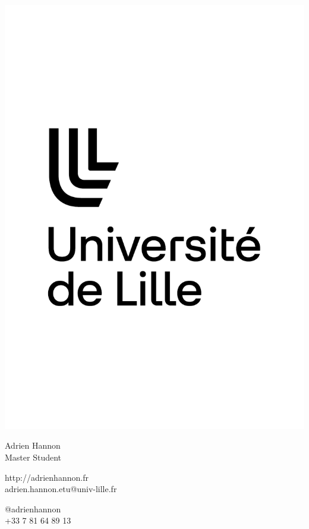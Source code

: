 \documentclass{article}
\begin{document}
\centering \includegraphics[width=.2\linewidth]{logo}\\[5pt]
\parbox{2in}{\Large \centering Adrien Hannon\\[1pt]
\normalsize Master Student}

\vfill
\raggedright
\begin{multicols}{2}
http://adrienhannon.fr\\
adrien.hannon.etu@univ-lille.fr

\columnbreak
\raggedleft
@adrienhannon\\
+33 7 81 64 89 13%
\end{multicols}%
\end{document}
